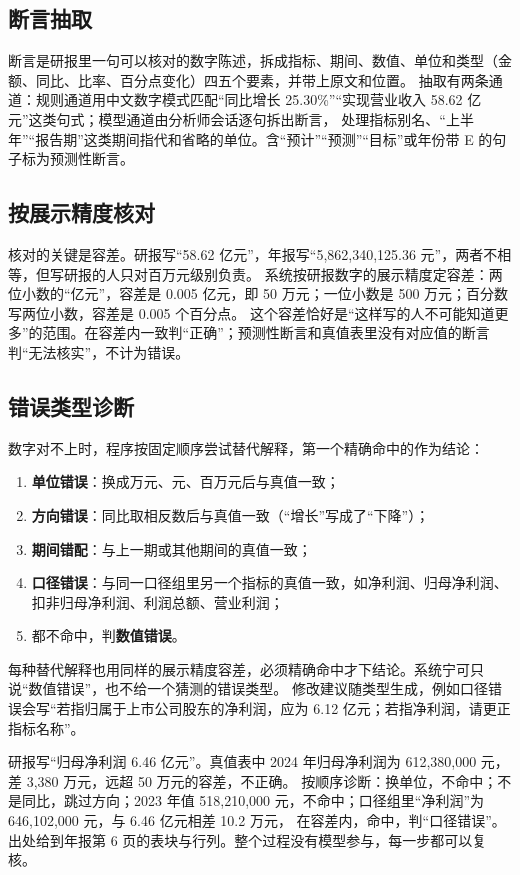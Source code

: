 \subsection{断言抽取}

断言是研报里一句可以核对的数字陈述，拆成指标、期间、数值、单位和类型（金额、同比、比率、百分点变化）四五个要素，并带上原文和位置。
抽取有两条通道：规则通道用中文数字模式匹配“同比增长 25.30\%”“实现营业收入 58.62 亿元”这类句式；模型通道由分析师会话逐句拆出断言，
处理指标别名、“上半年”“报告期”这类期间指代和省略的单位。含“预计”“预测”“目标”或年份带 E 的句子标为预测性断言。

\subsection{按展示精度核对}

核对的关键是容差。研报写“58.62 亿元”，年报写“5,862,340,125.36 元”，两者不相等，但写研报的人只对百万元级别负责。
系统按研报数字的展示精度定容差：两位小数的“亿元”，容差是 0.005 亿元，即 50 万元；一位小数是 500 万元；百分数写两位小数，容差是 0.005 个百分点。
这个容差恰好是“这样写的人不可能知道更多”的范围。在容差内一致判“正确”；预测性断言和真值表里没有对应值的断言判“无法核实”，不计为错误。

\subsection{错误类型诊断}

数字对不上时，程序按固定顺序尝试替代解释，第一个精确命中的作为结论：
\begin{enumerate}
  \item \textbf{单位错误}：换成万元、元、百万元后与真值一致；
  \item \textbf{方向错误}：同比取相反数后与真值一致（“增长”写成了“下降”）；
  \item \textbf{期间错配}：与上一期或其他期间的真值一致；
  \item \textbf{口径错误}：与同一口径组里另一个指标的真值一致，如净利润、归母净利润、扣非归母净利润、利润总额、营业利润；
  \item 都不命中，判\textbf{数值错误}。
\end{enumerate}
每种替代解释也用同样的展示精度容差，必须精确命中才下结论。系统宁可只说“数值错误”，也不给一个猜测的错误类型。
修改建议随类型生成，例如口径错误会写“若指归属于上市公司股东的净利润，应为 6.12 亿元；若指净利润，请更正指标名称”。

\begin{story}
研报写“归母净利润 6.46 亿元”。真值表中 2024 年归母净利润为 612,380,000 元，差 3,380 万元，远超 50 万元的容差，不正确。
按顺序诊断：换单位，不命中；不是同比，跳过方向；2023 年值 518,210,000 元，不命中；口径组里“净利润”为 646,102,000 元，与 6.46 亿元相差 10.2 万元，
在容差内，命中，判“口径错误”。出处给到年报第 6 页的表块与行列。整个过程没有模型参与，每一步都可以复核。
\end{story}

